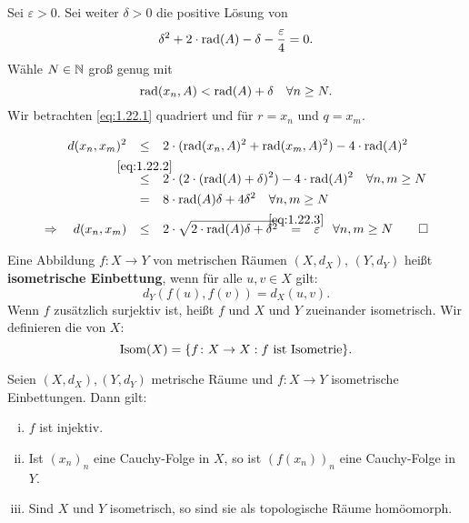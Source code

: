 \begin{beweis}
	Sei $\varepsilon > 0$.
	Sei weiter $\delta > 0$ die positive Lösung von 
	\begin{equation}
		\delta^2 + 2 \cdot \operatorname{rad}(A) - \delta - \frac{\varepsilon}{4} = 0. \label{eq:1.22.3}
	\end{equation}
	Wähle $N \in \mathbb{N}$ groß genug mit
	\begin{equation}
		\operatorname{rad}(x_n,A) < \operatorname{rad}(A) + \delta \quad \forall n \geq N. \label{eq:1.22.2}
	\end{equation}
	Wir betrachten \eqref{eq:1.22.1} quadriert und für $r = x_n$ und $q = x_m$.
	
	\begin{align*}
		d(x_n,x_m)^2 &\stack{}{\leq} 2 \cdot (\rad(x_n,A)^2 + \rad(x_m,A)^2) - 4 \cdot \rad(A)^2 \\
		&\stack{\eqref{eq:1.22.2}}{\leq} 2 \cdot (2 \cdot (\rad(A) + \delta)^2)-4 \cdot \rad(A)^2 \quad \forall n,m \geq N \\
		&\stack{}{=} 8 \cdot \rad(A) \delta + 4 \delta^2 \quad \forall n,m \geq N \\
		\Rightarrow \quad d(x_n,x_m) &\stack{}{\leq} 2 \cdot \sqrt{2 \cdot \rad(A) \delta + \delta^2} \stack{\eqref{eq:1.22.3}}{=} \varepsilon \quad \forall n,m \geq N \qedhere
	\end{align*}
\end{beweis}
\newpage
\begin{definition}[Isometrie]
\label{def:1.23}
	Eine Abbildung $f \colon X \rightarrow Y$ von metrischen Räumen $(X,d_X)$, $(Y,d_Y)$ heißt \textbf{isometrische Einbettung}, wenn für alle $u,v \in X$ gilt:
	\[
		d_Y(f(u),f(v)) = d_X(u,v).
	\]
	Wenn $f$ zusätzlich surjektiv ist, heißt $f$  und $X$ und $Y$ zueinander isometrisch. Wir definieren die  von $X$:
	\[
		\operatorname{Isom}(X) = \{f \colon X \rightarrow X : f \text{ ist Isometrie}\}.
	\]
\end{definition}

\begin{bemerkung}
\label{bem:1.24}
	Seien $(X,d_X), (Y,d_Y)$ metrische Räume und $f \colon X \rightarrow Y$ isometrische Einbettungen. Dann gilt:
	\begin{enumerate}[(i)]
		\item $f$ ist injektiv.
		\item Ist $(x_n)_n$ eine Cauchy-Folge in $X$, so ist $(f(x_n))_n$ eine Cauchy-Folge in $Y$.
		\item Sind $X$ und $Y$ isometrisch, so sind sie als topologische Räume homöomorph.
	\end{enumerate}
\end{bemerkung}

